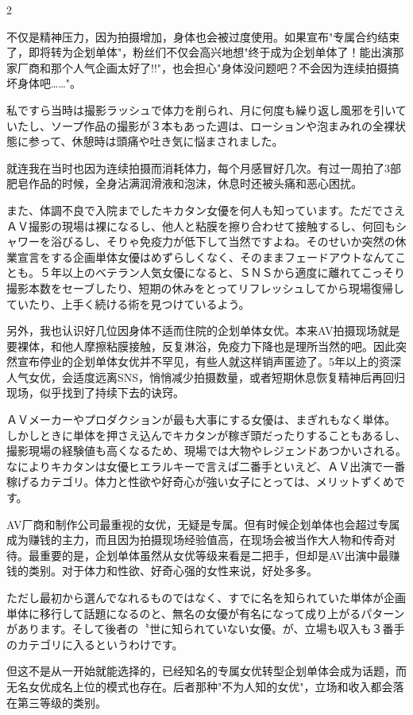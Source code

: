\documentclass[12pt,UTF8]{ctexbook}
\begin{document}
\begin{paracol}{2}
\switchcolumn

不仅是精神压力，因为拍摄增加，身体也会被过度使用。如果宣布"专属合约结束了，即将转为企划单体"，粉丝们不仅会高兴地想"终于成为企划单体了！能出演那家厂商和那个人气企画太好了!!"，也会担心"身体没问题吧？不会因为连续拍摄搞坏身体吧……"。

\switchcolumn*

私ですら当時は撮影ラッシュで体力を削られ、月に何度も繰り返し風邪を引いていたし、ソープ作品の撮影が３本もあった週は、ローションや泡まみれの全裸状態に参って、休憩時は頭痛や吐き気に悩まされました。

\switchcolumn

就连我在当时也因为连续拍摄而消耗体力，每个月感冒好几次。有过一周拍了3部肥皂作品的时候，全身沾满润滑液和泡沫，休息时还被头痛和恶心困扰。

\switchcolumn*

また、体調不良で入院までしたキカタン女優を何人も知っています。ただでさえＡＶ撮影の現場は裸になるし、他人と粘膜を擦り合わせて接触するし、何回もシャワーを浴びるし、そりゃ免疫力が低下して当然ですよね。そのせいか突然の休業宣言をする企画単体女優はめずらしくなく、そのままフェードアウトなんてことも。５年以上のベテラン人気女優になると、ＳＮＳから適度に離れてこっそり撮影本数をセーブしたり、短期の休みをとってリフレッシュしてから現場復帰していたり、上手く続ける術を見つけているよう。

\switchcolumn

另外，我也认识好几位因身体不适而住院的企划单体女优。本来AV拍摄现场就是要裸体，和他人摩擦粘膜接触，反复淋浴，免疫力下降也是理所当然的吧。因此突然宣布停业的企划单体女优并不罕见，有些人就这样销声匿迹了。5年以上的资深人气女优，会适度远离SNS，悄悄减少拍摄数量，或者短期休息恢复精神后再回归现场，似乎找到了持续下去的诀窍。

\switchcolumn*
ＡＶメーカーやプロダクションが最も大事にする女優は、まぎれもなく単体。しかしときに単体を押さえ込んでキカタンが稼ぎ頭だったりすることもあるし、撮影現場の経験値も高くなるため、現場では大物やレジェンドあつかいされる。なによりキカタンは女優ヒエラルキーで言えば二番手といえど、ＡＶ出演で一番稼げるカテゴリ。体力と性欲や好奇心が強い女子にとっては、メリットずくめです。

\switchcolumn

AV厂商和制作公司最重视的女优，无疑是专属。但有时候企划单体也会超过专属成为赚钱的主力，而且因为拍摄现场经验值高，在现场会被当作大人物和传奇对待。最重要的是，企划单体虽然从女优等级来看是二把手，但却是AV出演中最赚钱的类别。对于体力和性欲、好奇心强的女性来说，好处多多。

\switchcolumn*

ただし最初から選んでなれるものではなく、すでに名を知られていた単体が企画単体に移行して話題になるのと、無名の女優が有名になって成り上がるパターンがあります。そして後者の〝世に知られていない女優〟が、立場も収入も３番手のカテゴリに入るというわけです。

\switchcolumn

但这不是从一开始就能选择的，已经知名的专属女优转型企划单体会成为话题，而无名女优成名上位的模式也存在。后者那种"不为人知的女优"，立场和收入都会落在第三等级的类别。

\end{paracol}
\end{document}

